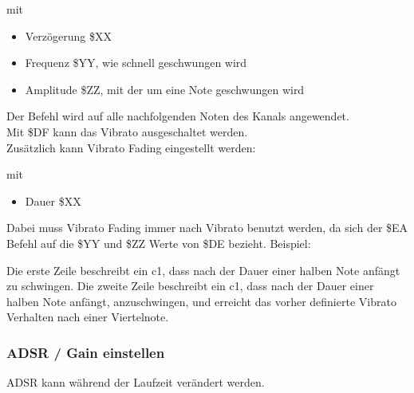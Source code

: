 mit

\begin{itemize}
	\item Verzögerung \$XX
	\item Frequenz  \$YY, wie schnell geschwungen wird
	\item Amplitude \$ZZ, mit der um eine Note geschwungen wird
\end{itemize}

Der Befehl wird auf alle nachfolgenden Noten des Kanals angewendet. \\
Mit \$DF kann das Vibrato ausgeschaltet werden. \\
Zusätzlich kann Vibrato Fading eingestellt werden:

\medskip



\medskip

mit

\begin{itemize}
	\item Dauer \$XX
\end{itemize}

Dabei muss Vibrato Fading immer nach Vibrato benutzt werden, da sich der \$EA Befehl auf die \$YY und \$ZZ Werte von \$DE bezieht. Beispiel:

\medskip



\medskip

Die erste Zeile beschreibt ein c1, dass nach der Dauer einer halben Note anfängt zu schwingen.
Die zweite Zeile beschreibt ein c1, dass nach der Dauer einer halben Note anfängt, anzuschwingen,
und erreicht das vorher definierte Vibrato Verhalten nach einer Viertelnote.


\subsubsection{ADSR / Gain einstellen}

ADSR kann während der Laufzeit verändert werden.

\medskip



